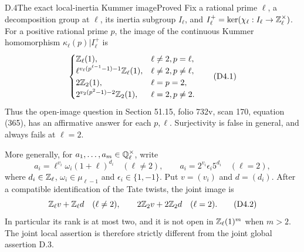 
\begin{statement}{D.4}{The exact local-inertia Kummer image}{Proved}
Fix a rational prime $\ell$, a decomposition group at $\ell$, its
inertia subgroup $I_\ell$, and
$I_\ell^+=\ker(\chi_\ell:I_\ell\to\mathbb Z_\ell^\times)$.
For a positive rational prime $p$, the image of the continuous Kummer
homomorphism $\kappa_\ell(p)|I_\ell^+$ is
\[
\begin{cases}
 \mathbb Z_\ell(1),&\ell\ne2, p=\ell,\\
 \ell^{v_\ell(p^{\ell-1}-1)-1}\mathbb Z_\ell(1),&\ell\ne2, p\ne\ell,\\
 2\mathbb Z_2(1),&\ell=p=2,\\
 2^{v_2(p^2-1)-2}\mathbb Z_2(1),&\ell=2, p\ne2.
\end{cases}
\tag{D4.1}
\]
Thus the open-image question in Section 51.15, folio 732v, scan 170,
equation (365), has an affirmative answer for each $p,\ell$.
Surjectivity is false in general, and always fails at $\ell=2$.

More generally, for $a_1,\ldots,a_m\in\mathbb Q_\ell^\times$, write
\[
 a_i=\ell^{v_i}\omega_i(1+\ell)^{d_i}\quad(\ell\ne2),
 \qquad a_i=2^{v_i}\epsilon_i5^{d_i}\quad(\ell=2),
\]
where $d_i\in\mathbb Z_\ell$, $\omega_i\in\mu_{\ell-1}$ and
$\epsilon_i\in\{1,-1\}$. Put $v=(v_i)$ and $d=(d_i)$.
After a compatible identification of the Tate twists, the joint image is
\[
 \mathbb Z_\ell v+\mathbb Z_\ell d\quad(\ell\ne2),
 \qquad 2\mathbb Z_2v+2\mathbb Z_2d\quad(\ell=2).
\tag{D4.2}
\]
In particular its rank is at most two, and it is not open in
$\mathbb Z_\ell(1)^m$ when $m>2$. The joint local assertion is therefore
strictly different from the joint global assertion D.3.
\end{statement}
